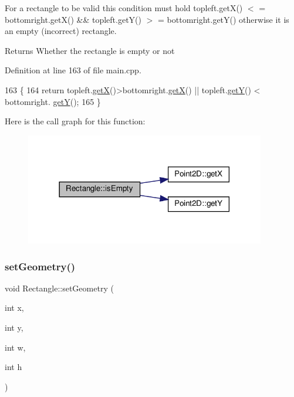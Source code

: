 For a rectangle to be valid this condition must hold topleft.\+get\+X() $<$ = bottomright.\+get\+X() \&\& topleft.\+get\+Y() $>$ = bottomright.\+get\+Y() otherwise it is an empty (incorrect) rectangle. 

\begin{DoxyReturn}{Returns}
Whether the rectangle is empty or not 
\end{DoxyReturn}


Definition at line 163 of file main.\+cpp.


\begin{DoxyCode}
163                          \{
164         \textcolor{keywordflow}{return} topleft.\hyperlink{classPoint2D_a5cb1c2584e5b2bada0226a3e32aa2b1a}{getX}()>bottomright.\hyperlink{classPoint2D_a5cb1c2584e5b2bada0226a3e32aa2b1a}{getX}() || topleft.\hyperlink{classPoint2D_a53d10f2e460c47a493a3fbadfbafbb64}{getY}() < bottomright.
      \hyperlink{classPoint2D_a53d10f2e460c47a493a3fbadfbafbb64}{getY}();
165     \}
\end{DoxyCode}
Here is the call graph for this function\+:
\nopagebreak
\begin{figure}[H]
\begin{center}
\leavevmode
\includegraphics[width=297pt]{classRectangle_af732bce8c96d2469994825e9a87dbe5f_cgraph}
\end{center}
\end{figure}
\mbox{\label{classRectangle_a31c4b9fc0d1ddf912f114da494e50205}} 
\subsubsection{\texorpdfstring{set\+Geometry()}{setGeometry()}\hspace{0.1cm}{\footnotesize\ttfamily [1/2]}}
{\footnotesize\ttfamily void Rectangle\+::set\+Geometry (\begin{DoxyParamCaption}\item[{int}]{x,  }\item[{int}]{y,  }\item[{int}]{w,  }\item[{int}]{h }\end{DoxyParamCaption})\hspace{0.3cm}{\ttfamily [inline]}}



